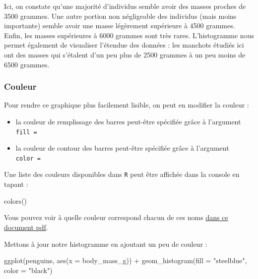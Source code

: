 \documentclass[
  a4paper,
  DIV=11,
  numbers=noendperiod,
  oneside]{scrreprt}
\newenvironment{Shaded}{}{}
\newcommand{\AttributeTok}[1]{\textcolor[rgb]{0.84,0.23,0.29}{#1}}
\newcommand{\FunctionTok}[1]{\textcolor[rgb]{0.44,0.26,0.76}{#1}}
\newcommand{\NormalTok}[1]{\textcolor[rgb]{0.14,0.16,0.18}{#1}}
\newcommand{\SpecialCharTok}[1]{\textcolor[rgb]{0.00,0.36,0.77}{#1}}
\newcommand{\StringTok}[1]{\textcolor[rgb]{0.01,0.18,0.38}{#1}}
\providecommand{\tightlist}{%
  \setlength{\itemsep}{0pt}\setlength{\parskip}{0pt}}\usepackage{longtable,booktabs,array}
\begin{document}
Ici, on constate qu'une majorité d'individus semble avoir des masses
proches de 3500 grammes. Une autre portion non négligeable des individus
(mais moins importante) semble avoir une masse légèrement supérieure à
4500 grammes. Enfin, les masses supérieures à 6000 grammes sont très
rares. L'histogramme nous permet également de visualiser l'étendue des
données : les manchots étudiés ici ont des masses qui s'étalent d'un peu
plus de 2500 grammes à un peu moins de 6500 grammes.

\subsubsection{Couleur}\label{couleur}

Pour rendre ce graphique plus facilement lisible, on peut en modifier la
couleur :

\begin{itemize}
\tightlist
\item
  la couleur de remplissage des barres peut-être spécifiée grâce à
  l'argument \texttt{fill\ =}
\item
  la couleur de contour des barres peut-être spécifiée grâce à
  l'argument \texttt{color\ =}
\end{itemize}

Une liste des couleurs disponibles dans \texttt{R} peut être affichée
dans la console en tapant :

\begin{Shaded}
\begin{Highlighting}[]
\FunctionTok{colors}\NormalTok{()}
\end{Highlighting}
\end{Shaded}

Vous pouvez voir à quelle couleur correspond chacun de ces noms
\href{http://www.stat.columbia.edu/~tzheng/files/Rcolor.pdf}{dans ce
document pdf}.

Mettons à jour notre histogramme en ajoutant un peu de couleur :

\begin{Shaded}
\begin{Highlighting}[]
\FunctionTok{ggplot}\NormalTok{(penguins, }\FunctionTok{aes}\NormalTok{(}\AttributeTok{x =}\NormalTok{ body\_mass\_g)) }\SpecialCharTok{+}
  \FunctionTok{geom\_histogram}\NormalTok{(}\AttributeTok{fill =} \StringTok{"steelblue"}\NormalTok{, }\AttributeTok{color =} \StringTok{"black"}\NormalTok{)}
\end{Highlighting}
\end{Shaded}
\end{document}
